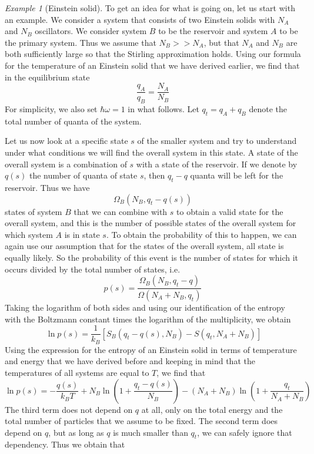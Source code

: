 \documentclass[a4paper, draft]{article}
\theoremstyle{own}
\theoremstyle{remark}
\newtheorem{example}{Example}[section]
\begin{document}
\begin{example}[Einstein solid]
To get an idea for what is going on, let us start with an example. We consider a system that consists of two Einstein solids with $N_A$ and $N_B$ oscillators. We consider system $B$ to be the reservoir and system $A$ to be the primary system. Thus we assume that $N_B >> N_A$, but that $N_A$ and $N_B$ are both sufficiently large so that the Stirling approximation holds. Using our formula for the temperature of an Einstein solid that we have derived earlier, we find that in the equilibrium state
$$
\frac{q_A}{q_B} = \frac{N_A}{N_B}
$$
For simplicity, we also set $\hbar \omega = 1$ in what follows. Let $q_t = q_A + q_B$ denote the total number of quanta of the system.




Let us now look at a specific state $s$ of the smaller system and try to understand under what conditions we will find the overall system in this state. A state of the overall system is a combination of $s$ with a state of the reservoir. If we denote by $q(s)$ the number of quanta of state $s$, then $q_t - q$ quanta will be left for the reservoir. Thus we have
$$
\Omega_B(N_B,q_t - q(s)) 
$$
states of system $B$ that we can combine with $s$ to obtain a valid state for the overall system, and this is the number of possible states of the overall system for which system $A$ is in state $s$. To obtain the probability of this to happen, we can again use our assumption that for the states of the overall system, all state is equally likely. So the probability of this event is the number of states for which it occurs divided by the total number of states, i.e.
$$
p(s) = \frac{\Omega_B(N_B,q_t - q)}{\Omega(N_A + N_B,q_t)}
$$
Taking the logarithm of both sides and using our identification of the entropy with the Boltzmann constant times the logarithm of the multiplicity, we obtain	
$$\
\ln p(s) = \frac{1}{k_B} [S_B(q_t - q(s), N_B) - S(q_t, N_A + N_B)]
$$
Using the expression for the entropy of an Einstein solid in terms of temperature and energy that we have derived before and keeping in mind that the temperatures of all systems are equal to $T$, we find that
$$
\ln p(s) = - \frac{q(s)}{k_B T} + N_B \ln (1 + \frac{q_t - q(s)}{N_B})  - (N_A + N_B) \ln (1 + \frac{q_t}{N_A + N_B}) 
$$	
The third term does not depend on $q$ at all, only on the total energy and the total number of particles that we assume to be fixed. The second term does depend on $q$, but as long as $q$ is much smaller than $q_t$, we can safely ignore that dependency. Thus we obtain that

\end{example}
\end{document}
